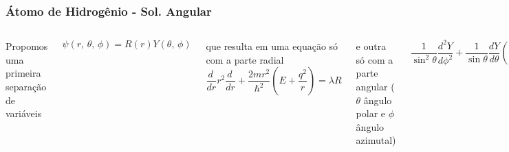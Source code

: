 \documentclass[12pt,brazil,table]{beamer}
\begin{document}
  


\begin{frame}
  \frametitle{Átomo de Hidrogênio - Sol. Angular}
  \fontsize{8pt}{11pt}\selectfont
  
  
  \begin{columns}[T]
    
    
      Propomos uma primeira separação de variáveis\vspace{-0.5cm}
    
      \[
        \psi\left( r,\,\theta,\,\phi\right) = R(r)Y(\theta,\,\phi)
      \]
      
      que resulta em uma equação só com a parte radial
      \[
      \dfrac{d\,}{dr}r^2\dfrac{d\,}{dr} +\dfrac{2mr^2}{\hbar^2}\left( E + \dfrac{q^2}{r} \right) = \lambda R
      \]
      
      e outra só com a parte angular ($\theta$ ângulo polar e $\phi$ ângulo azimutal)\vspace{-0.5cm}
      
      \[
        \dfrac{1}{\sin^2\theta}\dfrac{d^2 Y}{d \phi^2}+ \dfrac{1}{\sin \theta }\dfrac{d Y}{d \theta}\left(\sin \theta\dfrac{d Y}{d \theta} \right) = -\lambda Y
      \]
      
      Para esta equação propomos uma nova separação de variáveis

      \[
      Y(\theta,\, \phi) = \Theta(\theta) \Phi(\phi)
      \]
      
      que resulta em
      
        \rule{.1mm}{0.7\textheight}
    
      \vspace{-0.5cm}
      
      \[
      \dfrac{1}{\Theta}\left[\sin \theta\dfrac{d \Theta}{d \theta}\left(\sin \theta\dfrac{d Y}{d \theta} \right) + \lambda \Theta\sin^2 \theta \right] =  - \dfrac{1}{\Phi}\dfrac{d^2 \Phi}{d \phi^2}
      \]


      que nos leva a duas outras EDOs, uma para parte polar\vspace{-0.3cm}
      
      \[
      \sin \theta\dfrac{d \Theta}{d \theta}\left(\sin \theta\dfrac{d Y}{d \theta} \right) + \lambda \Theta\sin^2 \theta = m^2\Theta
      \]
      
      e para parte azimutal
      \[
        \dfrac{d^2 \Phi}{d \phi^2} = -m^2\Phi
      \]
      
      que tem por solução
      
      \[
       \Phi(\phi) = \dfrac{1}{\sqrt{2\pi}}\exp\left(im\phi\right)
      \]
      
      onde
      \[
       m\in\mathbb{Z}=0,\,\pm 1,\, \pm 2,\,\ldots
      \]
      
      é conhecida como número quântico magnético.     
  \end{columns}
\end{frame}
\end{document}
